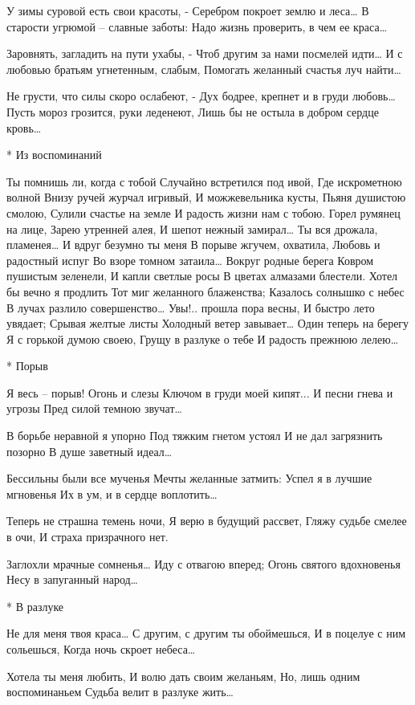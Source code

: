 У зимы суровой есть свои красоты, -
Серебром покроет землю и леса…
В старости угрюмой – славные заботы:
Надо жизнь проверить, в чем ее краса…

Заровнять, загладить на пути ухабы, -
Чтоб другим за нами посмелей идти…
И с любовью братьям угнетенным, слабым,
Помогать желанный счастья луч найти…

Не грусти, что силы скоро ослабеют, -
Дух бодрее, крепнет и в груди любовь…
Пусть мороз грозится, руки леденеют,
Лишь бы не остыла в добром сердце кровь…


* Из воспоминаний

Ты помнишь ли, когда с тобой
Случайно встретился под ивой,
Где искрометною волной
Внизу ручей журчал игривый,
И можжевельника кусты,
Пьяня душистою смолою,
Сулили счастье на земле
И радость жизни нам с тобою.
Горел румянец на лице,
Зарею утренней алея,
И шепот нежный замирал…
Ты вся дрожала, пламенея…
И вдруг безумно ты меня
В порыве жгучем, охватила,
Любовь и радостный испуг
Во взоре томном затаила…
Вокруг родные берега
Ковром пушистым зеленели,
И капли светлые росы
В цветах алмазами блестели.
Хотел бы вечно я продлить
Тот миг желанного блаженства;
Казалось солнышко с небес
В лучах разлило совершенство…
Увы!.. прошла пора весны,
И быстро лето увядает;
Срывая желтые листы
Холодный ветер завывает…
Один теперь на берегу
Я с горькой думою своею,
Грущу в разлуке о тебе
И радость прежнюю лелею…


* Порыв

Я весь – порыв! Огонь и слезы
Ключом в груди моей кипят...
И песни гнева и угрозы
Пред силой темною звучат…

В борьбе неравной я упорно
Под тяжким гнетом устоял
И не дал загрязнить позорно
В душе заветный идеал…

Бессильны были все мученья
Мечты желанные затмить:
Успел я в лучшие мгновенья
Их в ум, и в сердце воплотить…

Теперь не страшна темень ночи,
Я верю в будущий рассвет,
Гляжу судьбе смелее в очи,
И страха призрачного нет.

Заглохли мрачные сомненья…
Иду с отвагою вперед;
Огонь святого вдохновенья
Несу в запуганный народ…


* В разлуке

Не для меня твоя краса…
С другим, с другим ты обоймешься,
И в поцелуе с ним сольешься,
Когда ночь скроет небеса…

Хотела ты меня любить,
И волю дать своим желаньям,
Но, лишь одним воспоминаньем
Судьба велит в разлуке жить…

